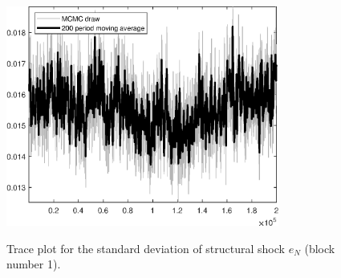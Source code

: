 \begin{figure}[H]
\centering
  \includegraphics[width=0.8\textwidth]{RBC_growth/graphs/TracePlot_SE_e_N_blck_1}\\
    \caption{Trace plot for the standard deviation of structural shock ${e_N}$ (block number 1).}
\end{figure}
